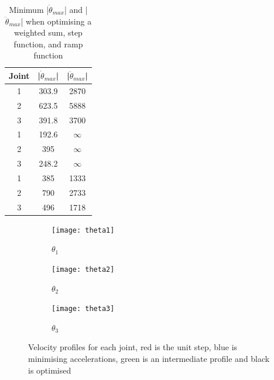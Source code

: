 \documentclass[twoside,twocolumn]{article}
\begin{document}
\begin{table}[h]
\centering 
\begin{tabular}{ c | c | c }
Joint&|$\dot{\theta}_{max}$|&|$\ddot{\theta}_{max}$|\\ 

\midrule
1&303.9&2870\\
2&623.5&5888\\
3&391.8&3700\\
\midrule
1&192.6&$\infty$\\
2&395&$\infty$\\
3&248.2&$\infty$\\
\midrule
1&385&1333\\
2&790&2733\\
3&496&1718\\
\end{tabular}
\caption{Minimum |$\dot{\theta}_{max}$| and |$\ddot{\theta}_{max}$| when optimising a weighted sum, step function, and ramp function}
\label{table:jointvel}
\end{table}

\begin{figure}[h]
\centering
    \begin{subfigure}[t]{0.33\linewidth}
        \centering
        \texttt{[image: theta1]}
        \caption{$\theta_1$}
        \label{sub:r1}
    \end{subfigure}%
    \begin{subfigure}[t]{0.33\linewidth}
        \centering
        \texttt{[image: theta2]}
        \caption{$\theta_2$ }
        \label{sub:r2}
    \end{subfigure}%
    \begin{subfigure}[t]{0.33\linewidth}
        \centering
        \texttt{[image: theta3]}
        \caption{$\theta_3$ }
        \label{sub:r3}
    \end{subfigure}%
    \caption{Velocity profiles for each joint, red is the unit step, blue is minimising accelerations, green is an intermediate profile and black is optimised}
    \label{fig:velp}
\end{figure}
\end{document}
